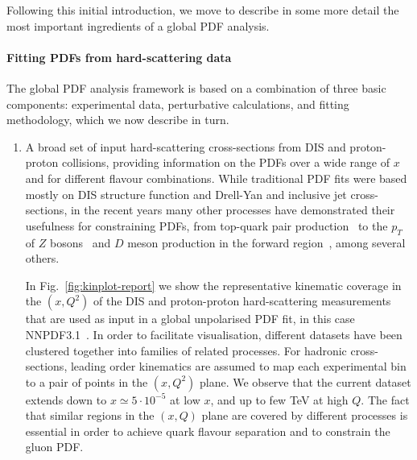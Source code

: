 Following this initial introduction, we move to describe in some more detail
the most important ingredients of a global PDF analysis.

\paragraph*{Fitting PDFs from hard-scattering data}
%
The global PDF analysis framework is based on a combination of three basic components: experimental
data, perturbative calculations, and fitting methodology, which we now describe
in turn.

\begin{enumerate}
\item A broad set of input hard-scattering cross-sections from DIS and proton-proton collisions, providing information on the PDFs
  over a wide range of $x$ and for different flavour combinations.
  While traditional PDF fits were based mostly on DIS structure function and Drell-Yan
  and inclusive jet
  cross-sections, in the recent years many other processes have demonstrated
  their usefulness for constraining PDFs, from top-quark pair production~\cite{Czakon:2016olj}
  to the $p_T$ of $Z$ bosons~\cite{Boughezal:2017nla}
  and $D$ meson production in the forward region~\cite{Gauld:2016kpd}, among
  several others.

  In Fig.~\ref{fig:kinplot-report} we show the representative kinematic coverage in the
    $(x,Q^2)$ of the DIS and proton-proton hard-scattering measurements that are
    used as input in a global unpolarised PDF fit, in this case NNPDF3.1~\cite{Ball:2017nwa}.
    In order to facilitate visualisation, different
    datasets have been clustered together into families of
    related processes.
      For hadronic cross-sections, leading order kinematics are assumed to map
    each experimental bin to a pair of points in the $(x,Q^2)$ plane.
    We observe that the current dataset extends down to $x\simeq 5\cdot 10^{-5}$
    at low $x$, and up to few TeV at high $Q$.
    The fact that similar regions in the $(x,Q)$ plane are covered by
    different processes is essential in order to achieve quark
    flavour separation and to constrain the gluon PDF.


\end{enumerate}
